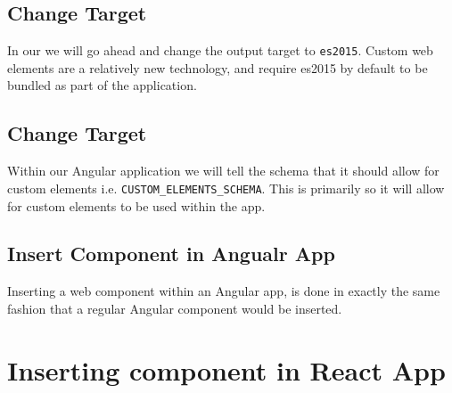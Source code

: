 \subsection{Change Target}
In our  we will go ahead and change the output target to \lstinline{es2015}. Custom web elements are a relatively new technology, and require es2015 by default to be bundled as part of the application. 

\subsection{Change Target}
Within our Angular application we will tell the schema that it should allow for custom elements i.e. \lstinline{CUSTOM_ELEMENTS_SCHEMA}. This is primarily so it will allow for custom elements to be used within the app. 

\subsection{Insert Component in Angualr App}
Inserting a web component within an Angular app, is done in exactly the same fashion that a regular Angular component would be inserted. 

\section{Inserting component in React App}

